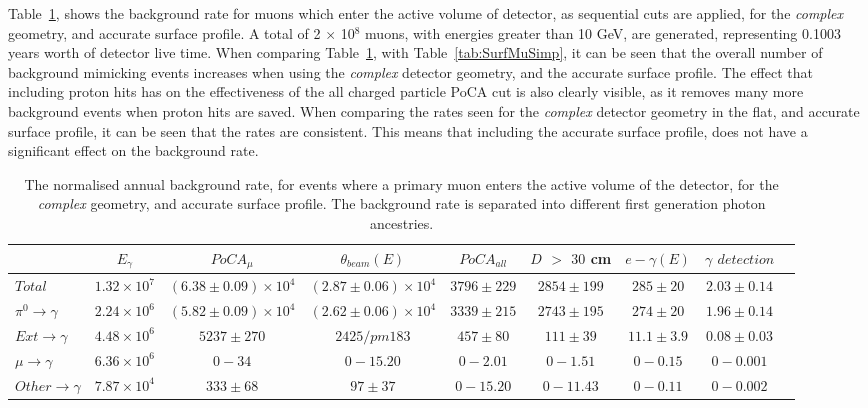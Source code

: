 Table~\ref{tab:SurfMuComp}, shows the background rate for muons which enter the active volume of detector, as sequential cuts are applied, for the \emph{complex} geometry, and accurate surface profile. A total of 2 $\times$ 10$^8$ muons, with energies greater than 10 GeV, are generated, representing 0.1003 years worth of detector live time. When comparing Table~\ref{tab:SurfMuComp}, with Table~\ref{tab:SurfMuSimp}, it can be seen that the overall number of background mimicking events increases when using the \emph{complex} detector geometry, and the accurate surface profile. The effect that including proton hits has on the effectiveness of the all charged particle PoCA cut is also clearly visible, as it removes many more background events when proton hits are saved. When comparing the rates seen for the \emph{complex} detector geometry in the flat, and accurate surface profile, it can be seen that the rates are consistent. This means that including the accurate surface profile, does not have a significant effect on the background rate. \\

\begin{table}
  \caption[The normalised annual background rate, for events where a primary muon enters the active volume of the detector, for the \emph{complex} geometry, and accurate surface profile]
          {The normalised annual background rate, for events where a primary muon enters the active volume of the detector, for the \emph{complex} geometry, and accurate surface profile. The background rate is separated into different first generation photon ancestries.}
  \label{tab:SurfMuComp}
  \centering
  \scriptsize
  \begin{tabular}{l c c c c c c c c }
    \toprule
        & $E_\gamma$ & $PoCA_\mu$ & $\theta_{beam}(E)$ & $PoCA_{all}$ & $D$ $>$ $30$ cm & $e-\gamma(E)$ & $\gamma$ $detection$ \\
        \midrule
        $Total$          & $1.32\times10^7$ & $(6.38\pm0.09)\times10^4$ & $(2.87\pm0.06)\times10^4$ & $3796\pm229$ & $2854\pm199$ & $285\pm20$   & $2.03\pm0.14$ \\

        $\pi^0\to\gamma$ & $2.24\times10^6$ & $(5.82\pm0.09)\times10^4$ & $(2.62\pm0.06)\times10^4$ & $3339\pm215$ & $2743\pm195$ & $274\pm20$   & $1.96\pm0.14$ \\

        $Ext\to\gamma$   & $4.48\times10^6$ & $5237\pm270$              & $2425/pm183$              & $457\pm80$   & $111\pm39$   & $11.1\pm3.9$ & $0.08\pm0.03$ \\

        $\mu\to\gamma$   & $6.36\times10^6$ & $0-34$                    & $0-15.20$                 & $0-2.01$     & $0-1.51$     & $0-0.15$     & $0-0.001$ \\

        $Other\to\gamma$ & $7.87\times10^4$ & $333\pm68$                & $97\pm37$                 & $0-15.20$    & $0-11.43$    & $0-0.11$     & $0-0.002$ \\
        \bottomrule
  \end{tabular}
\end{table}

